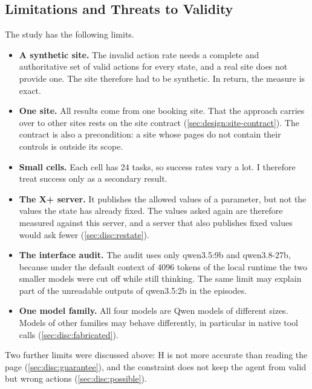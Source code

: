 \subsection{Limitations and Threats to Validity}\label{sec:disc:threats}

The study has the following limits.
\begin{itemize}
    \item \textbf{A synthetic site.}
    The invalid action rate needs a complete and authoritative set of valid actions for every state, and a real site does not provide one.
    The site therefore had to be synthetic.
    In return, the measure is exact.
    \item \textbf{One site.}
    All results come from one booking site.
    That the approach carries over to other sites rests on the site contract (\autoref{sec:design:site-contract}).
    The contract is also a precondition: a site whose pages do not contain their controls is outside its scope.
    \item \textbf{Small cells.}
    Each cell has 24 tasks, so success rates vary a lot.
    I therefore treat success only as a secondary result.
    \item \textbf{The X+ server.}
    It publishes the allowed values of a parameter, but not the values the state has already fixed.
    The values asked again are therefore measured against this server, and a server that also publishes fixed values would ask fewer (\autoref{sec:disc:restate}).
    \item \textbf{The interface audit.}
    The audit uses only qwen3.5:9b and qwen3.8-27b, because under the default context of 4096 tokens of the local runtime the two smaller models were cut off while still thinking.
    The same limit may explain part of the unreadable outputs of qwen3.5:2b in the episodes.
    \item \textbf{One model family.}
    All four models are Qwen models of different sizes.
    Models of other families may behave differently, in particular in native tool calls (\autoref{sec:disc:fabricated}).
\end{itemize}
Two further limits were discussed above: H is not more accurate than reading the page (\autoref{sec:disc:guarantee}), and the constraint does not keep the agent from valid but wrong actions (\autoref{sec:disc:possible}).